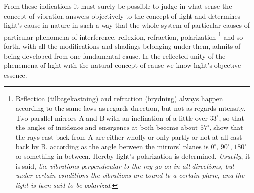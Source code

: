 \documentclass[12pt,a4paper]{book}
\begin{document}
From these indications it must surely be possible to judge in what sense the concept of vibration answers objectively to
the concept of light and determines light's cause in nature in such a way that the whole system of particular causes of
particular phenomena of
interference, reflexion, refraction, polarization%
\footnote{%
Reflection (tilbagekastning) and refraction (brydning) always happen according to the same laws as regards direction,
but not as regards intensity. Two parallel mirrors A and B with an inclination of a little over $33^{\circ}$, so that
the angles of incidence and emergence at both become about $57^{\circ}$, show that the rays cast back from A are either
wholly or only partly or not at all cast back by B, according as the angle between the mirrors' planes is $0^{\circ}$,
$90^{\circ}$, $180^{\circ}$ or something in between. Hereby light's polarization is determined.
\emph{Usually}, it is said, \emph{the vibrations perpendicular to the ray go on in all directions, but under certain
conditions the vibrations are bound to a certain plane, and the light is then said to be polarized}.}
and so forth, with all the modifications and shadings belonging under them, admits of being developed from one
fundamental cause. In the reflected unity of the phenomena of light with the natural concept of cause we know light's
objective essence.
\end{document}
